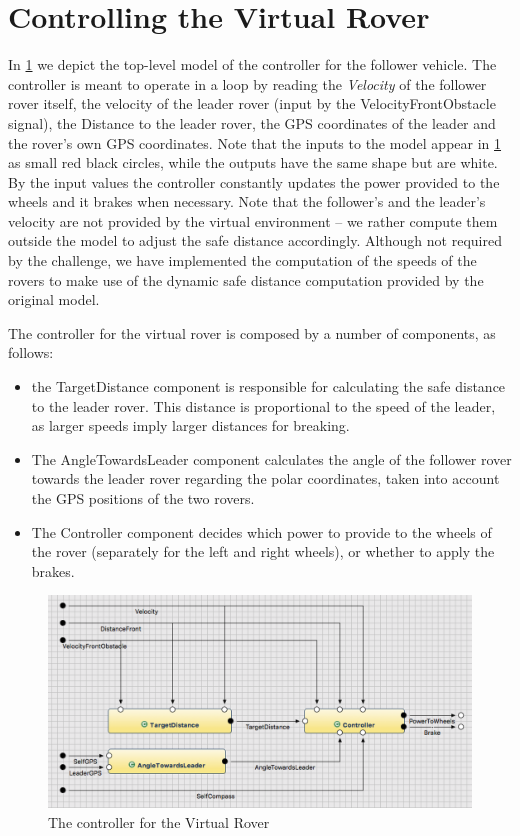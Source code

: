 \section{Controlling the Virtual Rover}
\label{sec:control_vr_model}

In \fig\ref{fig:rover_ctrl} we depict the top-level model of the controller for the
follower vehicle. The controller is meant to operate in a loop by reading the
\emph{Velocity} of the follower rover itself, the velocity of the leader rover
(input by the \textsf{VelocityFrontObstacle} signal), the \textsf{Distance} to
the leader rover, the GPS coordinates of the leader and the rover's own GPS
coordinates.
Note that the inputs to the model appear in \fig\ref{fig:rover_ctrl}  as small
red black circles, while the outputs have the same shape but are white. By the
input values the controller constantly updates the power provided to the
wheels and it brakes when necessary. Note that the follower's and the leader's velocity are not
provided by the virtual environment -- we rather compute them outside the model
to adjust the safe distance accordingly. Although not required by the challenge,
we have implemented the computation of the speeds of the rovers to make use of
the dynamic safe distance computation provided by the original \acc model.

The controller for the virtual rover is composed by a number of \af components,
as follows:
\begin{itemize}
  \item the \textsf{TargetDistance} component is responsible for calculating the
  safe distance to the leader rover. This distance is proportional to the speed
  of the leader, as larger speeds imply larger distances for breaking. 
\item The \textsf{AngleTowardsLeader} component calculates the angle of the
follower rover towards the leader rover regarding the polar coordinates, taken
into account the GPS positions of the two rovers.
\item The \textsf{Controller} component decides which power to
provide to the wheels of the rover (separately for the left and right wheels), or whether to
apply the brakes.
\end{itemize}

\begin{figure}[!h]
\centering
\includegraphics[width=1\textwidth]{images/top_level_controller.png}
\caption{The controller for the Virtual Rover}
\label{fig:rover_ctrl}
\end{figure}


